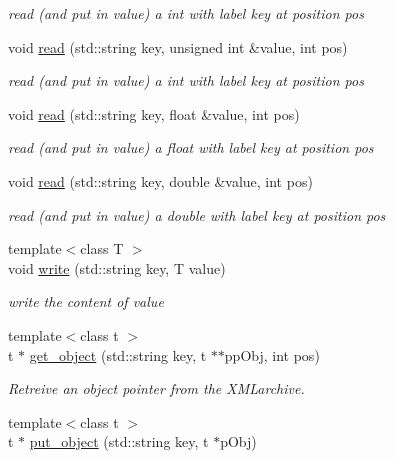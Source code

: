 \begin{DoxyCompactItemize}
\begin{DoxyCompactList}\small\item\em read (and put in value) a int with label key at position pos \end{DoxyCompactList}\item 
void \hyperlink{classeternity_1_1xml__archive_ab38c114af01eaffade2ab426f73a5575}{read} (std\+::string key, unsigned int \&value, int pos)
\begin{DoxyCompactList}\small\item\em read (and put in value) a int with label key at position pos \end{DoxyCompactList}\item 
void \hyperlink{classeternity_1_1xml__archive_a7b72b8361778f9a98bed64e9d23a760d}{read} (std\+::string key, float \&value, int pos)
\begin{DoxyCompactList}\small\item\em read (and put in value) a float with label key at position pos \end{DoxyCompactList}\item 
void \hyperlink{classeternity_1_1xml__archive_a83705b3ef651a402e886d73f288800ef}{read} (std\+::string key, double \&value, int pos)
\begin{DoxyCompactList}\small\item\em read (and put in value) a double with label key at position pos \end{DoxyCompactList}\item 
{\footnotesize template$<$class T $>$ }\\void \hyperlink{classeternity_1_1xml__archive_ab64fb09677fff76fb2935930f73365a6}{write} (std\+::string key, T value)
\begin{DoxyCompactList}\small\item\em write the content of value \end{DoxyCompactList}\item 
{\footnotesize template$<$class t $>$ }\\t $\ast$ \hyperlink{classeternity_1_1xml__archive_abc5b89e39007323cefb8855492795631}{get\+\_\+object} (std\+::string key, t $\ast$$\ast$pp\+Obj, int pos)
\begin{DoxyCompactList}\small\item\em Retreive an object pointer from the X\+M\+Larchive. \end{DoxyCompactList}\item 
{\footnotesize template$<$class t $>$ }\\t $\ast$ \hyperlink{classeternity_1_1xml__archive_af471f4a154095b98cf33dacd984281df}{put\+\_\+object} (std\+::string key, t $\ast$p\+Obj)
$$
\end{DoxyCompactItemize}
